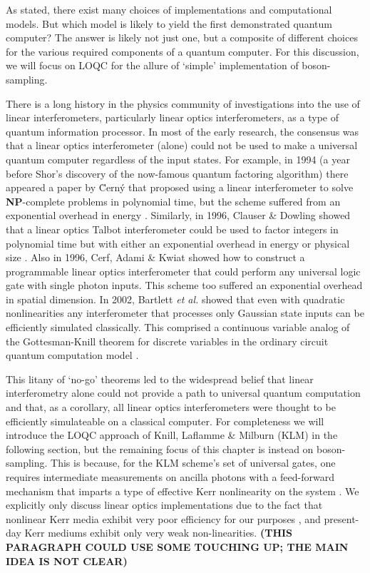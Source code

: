 \documentclass[aps,pra,twocolumn,amsmath,amssymb,nofootinbib,superscriptaddress]{revtex4}
\begin{document}
As stated, there exist many choices of implementations and computational models. But which model is likely to yield the first demonstrated quantum computer? The answer is likely not just one, but a composite of different choices for the various required components of a quantum computer. For this discussion, we will focus on LOQC for the allure of `simple' implementation of boson-sampling.

There is a long history in the physics community of investigations into the use of linear interferometers, particularly linear optics interferometers, as a type of quantum information processor. In most of the early research, the consensus was that a linear optics interferometer (alone) could not be used to make a universal quantum computer regardless of the input states. For example, in 1994 (a year before Shor's discovery of the now-famous quantum factoring algorithm) there appeared a paper by {\u C}ern{\' y} that proposed using a linear interferometer to solve \textbf{NP}-complete problems in polynomial time, but the scheme suffered from an exponential overhead in energy \cite{cerny}. Similarly, in 1996, Clauser \& Dowling showed that a linear optics Talbot interferometer could be used to factor integers in polynomial time but with either an exponential overhead in energy or physical size \cite{clauser}. Also in 1996, Cerf, Adami \& Kwiat showed how to construct a programmable linear optics interferometer that could perform any universal logic gate with single photon inputs.  This scheme too suffered an exponential overhead in spatial dimension. In 2002, Bartlett \emph{et al.} showed that even with quadratic nonlinearities any interferometer that processes only Gaussian state inputs can be efficiently simulated classically.  This comprised a continuous variable analog of the Gottesman-Knill theorem for discrete variables in the ordinary circuit quantum computation model \cite{bart}. 

This litany of `no-go' theorems led to the widespread belief that linear interferometry alone could not provide a path to universal quantum computation and that, as a corollary, all linear optics interferometers were thought to be efficiently simulateable on a classical computer. For completeness we will introduce the LOQC approach of Knill, Laflamme \& Milburn (KLM) \cite{knill,kok} in the following section, but the remaining focus of this chapter is instead on boson-sampling. This is because, for the KLM scheme's set of universal gates, one requires intermediate measurements on ancilla photons with a feed-forward mechanism that imparts a type of effective Kerr nonlinearity on the system \cite{lap}. We explicitly only discuss linear optics implementations due to the fact that nonlinear Kerr media exhibit very poor efficiency for our purposes \cite{nielsen}, and present-day Kerr mediums exhibit only very weak non-linearities. \textbf{(THIS PARAGRAPH COULD USE SOME TOUCHING UP; THE MAIN IDEA IS NOT CLEAR)}
\end{document}

